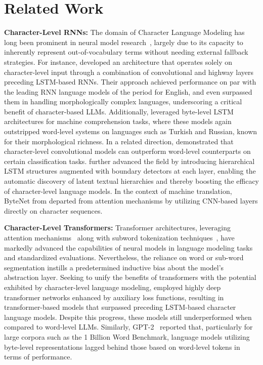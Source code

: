 \section{Related Work}
\label{section:related_work}

\textbf{Character-Level RNNs:} The domain of Character Language Modeling has long been prominent in neural model research~\citep{sutskever2011generating,mikolov2012subword,graves2013generating}, largely due to its capacity to inherently represent out-of-vocabulary terms without needing external fallback strategies. For instance, \cite{kim2016character} developed an architecture that operates solely on character-level input through a combination of convolutional and highway layers preceding LSTM-based RNNs. Their approach achieved performance on par with the leading RNN language models of the period for English, and even surpassed them in handling morphologically complex languages, underscoring a critical benefit of character-based LLMs. Additionally, \cite{kenter2018byte} leveraged byte-level LSTM architectures for machine comprehension tasks, where these models again outstripped word-level systems on languages such as Turkish and Russian, known for their morphological richness. In a related direction, \cite{zhang2015character} demonstrated that character-level convolutional models can outperform word-level counterparts on certain classification tasks. \citet{chung2019hierarchical} further advanced the field by introducing hierarchical LSTM structures augmented with boundary detectors at each layer, enabling the automatic discovery of latent textual hierarchies and thereby boosting the efficacy of character-level language models. In the context of machine translation, ByteNet from \cite{kalchbrenner2016neural} departed from attention mechanisms by utilizing CNN-based layers directly on character sequences.

\textbf{Character-Level Transformers:} Transformer architectures, leveraging attention mechanisms~\citep{vaswani2017attention} along with subword tokenization techniques~\citep{sennrich-etal-2016-neural}, have markedly advanced the capabilities of neural models in language modeling tasks and standardized evaluations. Nevertheless, the reliance on word or sub-word segmentation instills a predetermined inductive bias about the model's abstraction layer. Seeking to unify the benefits of transformers with the potential exhibited by character-level language modeling, \citet{al2019character} employed highly deep transformer networks enhanced by auxiliary loss functions, resulting in transformer-based models that surpassed preceding LSTM-based character language models. Despite this progress, these models still underperformed when compared to word-level LLMs. Similarly, GPT-2~\citep{radfordgpt2} reported that, particularly for large corpora such as the 1 Billion Word Benchmark, language models utilizing byte-level representations lagged behind those based on word-level tokens in terms of performance.

